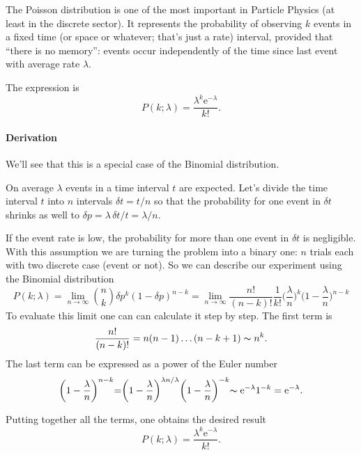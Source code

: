\documentclass[
	10pt,
	draft
]{scrreprt}
\newcommand{\eu}{\ensuremath{\mathrm{e}}}
\begin{document}
The Poisson distribution is one of the most important in Particle Physics (at least in the discrete sector).
It represents the probability of observing $k$ events in a fixed time (or space or whatever; that's just a rate) interval, provided that ``there is no memory'': events occur independently of the time since last event with average rate $\lambda$.

The expression is
\begin{equation}
P(k;\lambda) = \frac{\lambda^k \eu^{-\lambda}}{k!}.
\end{equation}

\paragraph{Derivation} We'll see that this is a special case of the Binomial distribution.

On average $\lambda$ events in a time interval $t$ are expected.
Let's divide the time interval $t$ into $n$ intervals $\delta t = t/n$ so that the probability for one event in $\delta t$ shrinks as well to $\delta p = \lambda \,\delta t/t = \lambda/n$.

If the event rate is low, the probability for more than one event in $\delta t$ is negligible.
With this assumption we are turning the problem into a binary one: $n$ trials each with two discrete case (event or not).
So we can describe our experiment using the Binomial distribution
\begin{equation}
P(k;\lambda) = \lim_{n\to\infty} {n\choose k} \delta p^k( 1  - \delta p)^{n - k}
= \lim_{n\to \infty} \frac{n!}{(n-k)!}\frac{1}{k!}\biggr(\frac{\lambda}{n}\biggl)^k\biggr(1-\frac{\lambda}{n}\biggl)^{n-k}
\end{equation}
To evaluate this limit one can can calculate it step by step.
The first term is
\begin{equation}
\frac{n!}{(n-k)!} = n(n-1)\dots(n-k+1) \thicksim n^k.
\end{equation}
The last term can be expressed as a power of the Euler number
\begin{equation}
\biggr(1-\frac{\lambda}{n}\biggl)^{n-k} = \biggr(1-\frac{\lambda}{n}\biggl)^{\lambda n/\lambda} \biggr(1-\frac{\lambda}{n}\biggl)^{-k} \thicksim \eu^{-\lambda} 1^{-k} = \eu^{-\lambda}.
\end{equation}


Putting together all the terms, one obtains the desired result
\begin{equation}
P(k;\lambda) = \frac{\lambda^k \eu^{-\lambda}}{k!}.
\end{equation}
\end{document}
